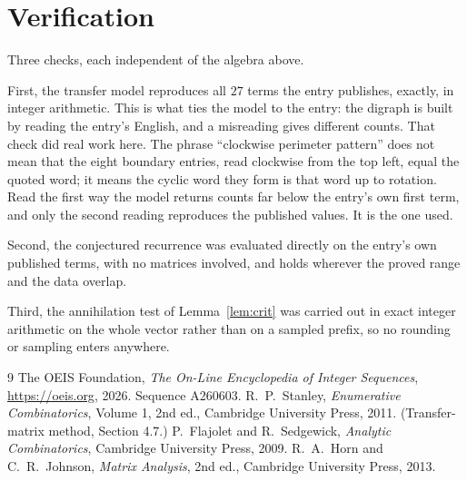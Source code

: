 \documentclass[11pt,a4paper]{article}
\theoremstyle{plain}
\theoremstyle{definition}
\begin{document}
\section{Verification}

Three checks, each independent of the algebra above.

First, the transfer model reproduces all $27$ terms the entry publishes, exactly, in
integer arithmetic. This is what ties the model to the entry: the digraph is built by reading
the entry's English, and a misreading gives different counts. That check did real work here. The phrase ``clockwise perimeter pattern'' does not mean that the eight boundary entries, read clockwise from the top left, equal the quoted word; it means the cyclic word they form is that word up to rotation. Read the first way the model returns counts far below the entry's own first term, and only the second reading reproduces the published values. It is the one used.

Second, the conjectured recurrence was evaluated directly on the entry's own published terms,
with no matrices involved, and holds wherever the proved range and the data overlap.

Third, the annihilation test of Lemma~\ref{lem:crit} was carried out in exact integer
arithmetic on the whole vector rather than on a sampled prefix, so no rounding or sampling
enters anywhere.

\begin{thebibliography}{9}
 The OEIS Foundation, \emph{The On-Line Encyclopedia of Integer
Sequences}, \url{https://oeis.org}, 2026. Sequence A260603.
 R.~P.~Stanley, \emph{Enumerative Combinatorics}, Volume 1, 2nd ed.,
Cambridge University Press, 2011. (Transfer-matrix method, Section 4.7.)
 P.~Flajolet and R.~Sedgewick, \emph{Analytic Combinatorics}, Cambridge
University Press, 2009.
 R.~A.~Horn and C.~R.~Johnson, \emph{Matrix Analysis}, 2nd ed., Cambridge
University Press, 2013.
\end{thebibliography}
\end{document}
